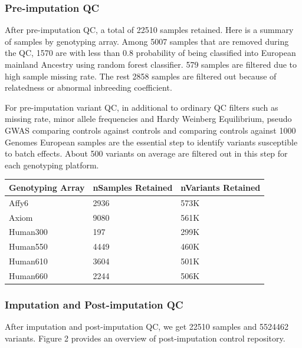 \documentclass[12pt]{amsart}
\begin{document}
\subsubsection{Pre-imputation QC}
After pre-imputation QC, a total of 22510 samples retained. Here is a summary of samples by genotyping array. Among 5007 samples that are removed during the QC, 1570 are with less than 0.8 probability of being classified into European mainland Ancestry using random forest classifier. 579 samples are filtered due to high sample missing rate. The rest 2858 samples are filtered out because of relatedness or abnormal inbreeding coefficient. 

For pre-imputation variant QC, in additional to ordinary QC filters such as missing rate, minor allele frequencies and Hardy Weinberg Equilibrium, pseudo GWAS comparing controls against controls and comparing controls against 1000 Genomes European samples are the essential step to identify variants susceptible to batch effects. About 500 variants on average are filtered out in this step for each genotyping platform.

\begin{table}[H]
\begin{tabular}{lll}
\hline
Genotyping Array & nSamples Retained & nVariants Retained \\
\hline
Affy6                 & 2936  & 573K \\
Axiom                 & 9080  & 561K \\
Human300              & 197   & 299K \\
Human550              & 4449  & 460K \\
Human610              & 3604  & 501K \\
Human660              & 2244  & 506K \\
\hline
\end{tabular}
\end{table}

\subsubsection{Imputation and Post-imputation QC} 
After imputation and post-imputation QC, we get 22510 samples and 5524462 variants. Figure 2 provides an overview of post-imputation control repository. 
\end{document}
